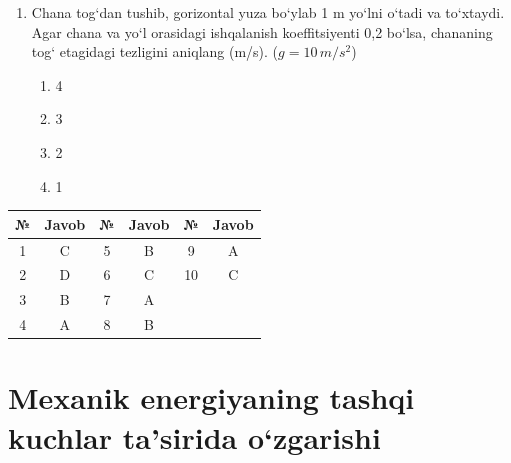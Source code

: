\begin{enumerate}
\item Chana tog‘dan tushib, gorizontal yuza bo‘ylab 1 m yo‘lni o‘tadi va to‘xtaydi. Agar chana va yo‘l orasidagi ishqalanish koeffitsiyenti 0,2 bo‘lsa, chananing tog‘ etagidagi tezligini aniqlang (m/s). ($g = 10 \, m/s^2$)
\begin{enumerate}[label=\Alph*)]
\item 4
\item 3
\item 2
\item 1
\end{enumerate}

\end{enumerate}



\begin{table}[h!]
\centering
\begin{tabular}{|c|c|c|c|c|c|}
\hline
\textbf{№} & \textbf{Javob} & \textbf{№} & \textbf{Javob} & \textbf{№} & \textbf{Javob} \\ \hline
1 & C & 5 & B & 9 & A \\ \hline
2 & D & 6 & C & 10 & C \\ \hline
3 & B & 7 & A & & \\ \hline
4 & A & 8 & B & & \\ \hline
\end{tabular}
\end{table}




\section{Mexanik energiyaning tashqi kuchlar ta’sirida o`zgarishi}


